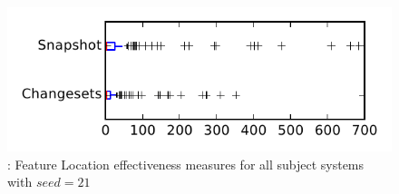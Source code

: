 
\begin{figure}
\centering
\includegraphics[height=0.4\textheight]{figures/flt_seed/rq1_tiny_21}
\caption{\rone: Feature Location effectiveness measures for all subject systems with $seed=21$}
\label{fig:flt_seed:rq1:tiny}
\end{figure}
